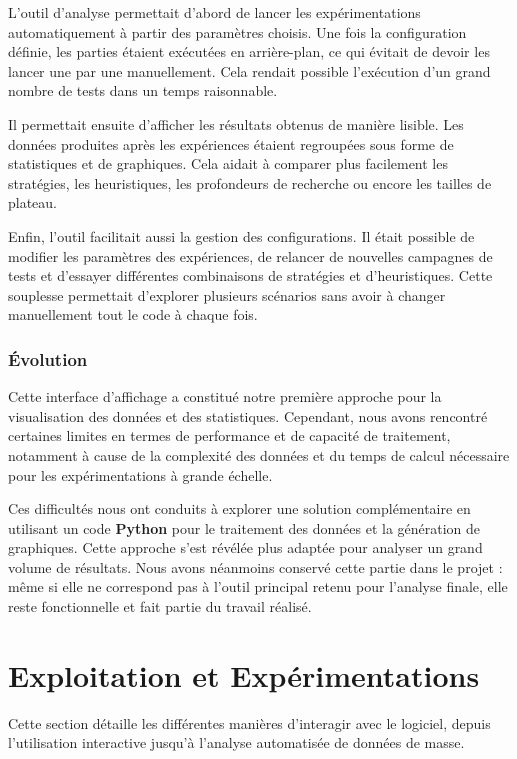 \documentclass[11pt,a4paper]{article}
\begin{document}
L’outil d’analyse permettait d’abord de lancer les expérimentations automatiquement à partir des paramètres choisis. Une fois la configuration définie, les parties étaient exécutées en arrière-plan, ce qui évitait de devoir les lancer une par une manuellement. Cela rendait possible l’exécution d’un grand nombre de tests dans un temps raisonnable.

Il permettait ensuite d’afficher les résultats obtenus de manière lisible. Les données produites après les expériences étaient regroupées sous forme de statistiques et de graphiques. Cela aidait à comparer plus facilement les stratégies, les heuristiques, les profondeurs de recherche ou encore les tailles de plateau.

Enfin, l’outil facilitait aussi la gestion des configurations. Il était possible de modifier les paramètres des expériences, de relancer de nouvelles campagnes de tests et d’essayer différentes combinaisons de stratégies et d’heuristiques. Cette souplesse permettait d’explorer plusieurs scénarios sans avoir à changer manuellement tout le code à chaque fois.

\subsubsection{Évolution}

Cette interface d’affichage a constitué notre première approche pour la visualisation des données et des statistiques. Cependant, nous avons rencontré certaines limites en termes de performance et de capacité de traitement, notamment à cause de la complexité des données et du temps de calcul nécessaire pour les expérimentations à grande échelle.

Ces difficultés nous ont conduits à explorer une solution complémentaire en utilisant un code \textbf{Python} pour le traitement des données et la génération de graphiques. Cette approche s’est révélée plus adaptée pour analyser un grand volume de résultats. Nous avons néanmoins conservé cette partie dans le projet : même si elle ne correspond pas à l’outil principal retenu pour l’analyse finale, elle reste fonctionnelle et fait partie du travail réalisé.


\section{Exploitation et Expérimentations}

Cette section détaille les différentes manières d'interagir avec le logiciel, depuis l'utilisation interactive jusqu'à l'analyse automatisée de données de masse.
\end{document}
